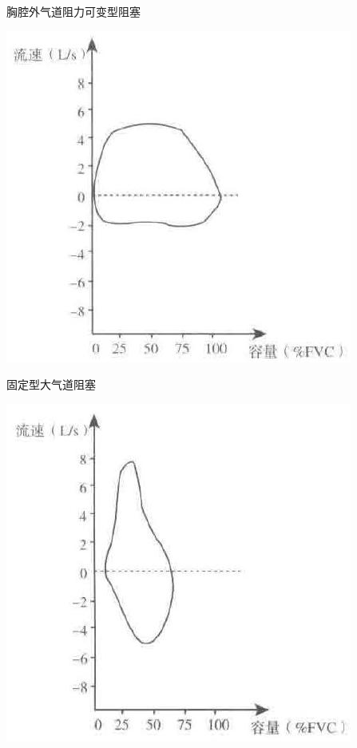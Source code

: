 \documentclass[10pt]{article}
\begin{document}
胸腔外气道阻力可变型阻塞

\begin{center}
\includegraphics[max width=\textwidth]{2024_07_05_645bb794a4d4f32ee0c8g-101(2)}
\end{center}

固定型大气道阻塞

\begin{center}
\includegraphics[max width=\textwidth]{2024_07_05_645bb794a4d4f32ee0c8g-101(1)}
\end{center}
\end{document}
